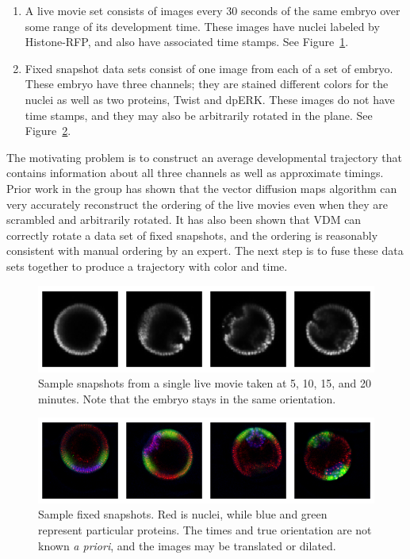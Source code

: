 \documentclass[12pt]{article}
\begin{document}
\begin{enumerate}
\item A live movie set consists of images every 30 seconds of the same embryo over some range of its development time. These images have nuclei labeled by Histone-RFP, and also have associated time stamps. See Figure~\ref{fig:live}.
\item Fixed snapshot data sets consist of one image from each of a set of embryo. These embryo have three channels; they are stained different colors for the nuclei as well as two proteins, Twist and dpERK. These images do not have time stamps, and they may also be arbitrarily rotated in the plane. See Figure~\ref{fig:fixed}.
\end{enumerate}

The motivating problem is to construct an average developmental trajectory that contains information about all three channels as well as approximate timings. Prior work in the group has shown that the vector diffusion maps algorithm can very accurately reconstruct the ordering of the live movies even when they are scrambled and arbitrarily rotated. It has also been shown that VDM can correctly rotate a data set of fixed snapshots, and the ordering is reasonably consistent with manual ordering by an expert. The next step is to fuse these data sets together to produce a trajectory with color and time.

\def\livegraphic{\includegraphics[width=\linewidth]{figures/live}}
\begin{figure}[h]
\livegraphic
\caption{Sample snapshots from a single live movie taken at 5, 10, 15, and 20 minutes. Note that the embryo stays in the same orientation.}
\label{fig:live}
\end{figure}
\newlength{\liveheight}
\settoheight{\liveheight}{\livegraphic}

\begin{figure}[h]
\includegraphics[width=\linewidth]{figures/fixed}
\caption{Sample fixed snapshots. Red is nuclei, while blue and green represent particular proteins. The times and true orientation are not known \textit{a priori}, and the images may be translated or dilated.}
\label{fig:fixed}
\end{figure}
\end{document}
